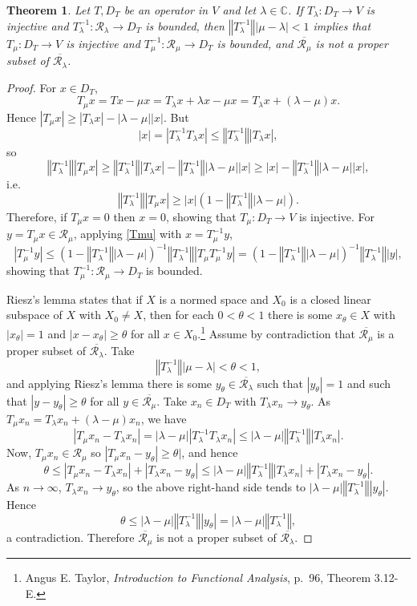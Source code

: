 \documentclass{article}
\newcommand{\norm}[1]{\left\Vert #1 \right\Vert}
\newtheorem{theorem}{Theorem}
\theoremstyle{definition}
\begin{document}
\begin{theorem}
Let $T,D_T$ be an operator in $V$ and let $\lambda \in \mathbb{C}$. If $T_\lambda:D_T \to V$ is injective and
$T_\lambda^{-1}:\mathscr{R}_\lambda \to D_T$ is bounded, 
then $\norm{T_\lambda^{-1}} |\mu - \lambda| < 1$ implies that $T_\mu:D_T \to V$ is injective and 
$T_\mu^{-1}:\mathscr{R}_\mu \to D_T$ is bounded, and $\overline{\mathscr{R}_\mu}$ is not a proper subset of
$\overline{\mathscr{R}_\lambda}$.
\label{resolventtheorem}
\end{theorem}
\begin{proof}
For $x \in D_T$,
\[
T_\mu x = Tx - \mu x = T_\lambda x + \lambda x - \mu x = T_\lambda x + (\lambda-\mu)x.
\]
Hence $|T_\mu x| \geq |T_\lambda x| - |\lambda-\mu| |x|$. But
\[
|x|=
|T_\lambda^{-1} T_\lambda x| \leq \norm{T_\lambda^{-1}} |T_\lambda x|,
\]
so 
\[
\norm{T_\lambda^{-1}} |T_\mu x| \geq \norm{T_\lambda^{-1}}  |T_\lambda x| - \norm{T_\lambda^{-1}} |\lambda-\mu| |x|
\geq |x| -  \norm{T_\lambda^{-1}} |\lambda-\mu| |x|,
\]
i.e.
\begin{equation}
\norm{T_\lambda^{-1}} |T_\mu x| \geq |x|(1- \norm{T_\lambda^{-1}} |\lambda-\mu|).
\label{Tmu}
\end{equation}
Therefore, if $T_\mu x=0$ then $x=0$, showing that $T_\mu:D_T \to V$ is injective.
For $y=T_\mu x \in \mathscr{R}_\mu$, applying \eqref{Tmu} with $x=T_\mu^{-1}y$,
\[
|T_\mu^{-1} y| \leq (1- \norm{T_\lambda^{-1}} |\lambda-\mu|)^{-1} \norm{T_\lambda^{-1}} |T_\mu T_\mu^{-1}y| 
=(1- \norm{T_\lambda^{-1}} |\lambda-\mu|)^{-1} \norm{T_\lambda^{-1}} |y|,
\]
showing that $T_\mu^{-1}:\mathscr{R}_\mu \to D_T$ is bounded.

Riesz's lemma states that if $X$ is a normed  space and $X_0$ is a closed linear subspace of $X$ with $X_0 \neq X$,
then for each $0<\theta<1$ there is some $x_\theta \in X$ with $|x_\theta|=1$ and $|x-x_\theta| \geq \theta$ for all
$x \in X_0$.\footnote{Angus E. Taylor, {\em Introduction to Functional Analysis}, p.~96, Theorem 3.12-E.}
Assume by contradiction that $\overline{\mathscr{R}_\mu}$ is a proper subset of $\overline{\mathscr{R}_\lambda}$. 
Take
\[
\norm{T_\lambda^{-1}} |\mu - \lambda| < \theta < 1,
\]
and applying Riesz's lemma there is some
$y_\theta \in \overline{\mathscr{R}_\lambda}$ such that $|y_\theta|=1$ and such that
$|y-y_\theta| \geq \theta$ for all $y \in \overline{\mathscr{R}_\mu}$. 
Take $x_n \in D_T$ with $T_\lambda x_n \to y_\theta$. As $T_\mu x_n = T_\lambda x_n + (\lambda-\mu)x_n$,
we have 
\[
|T_\mu x_n - T_\lambda x_n| = |\lambda-\mu| |T_\lambda^{-1} T_\lambda x_n| \leq |\lambda-\mu| 
\norm{T_\lambda^{-1}} |T_\lambda x_n|.
\]
Now, $T_\mu x_n \in \mathscr{R}_\mu$ so $|T_\mu x_n - y_\theta| \geq \theta|$, and hence 
\[
\theta \leq |T_\mu x_n - T_\lambda x_n| + |T_\lambda x_n - y_\theta|
\leq |\lambda-\mu| 
\norm{T_\lambda^{-1}} |T_\lambda x_n|+|T_\lambda x_n - y_\theta|.
\]
As $n \to \infty$, $T_\lambda x_n \to y_\theta$, so the above right-hand side tends to 
$|\lambda-\mu| 
\norm{T_\lambda^{-1}} |y_\theta|$. Hence
\[
\theta \leq |\lambda-\mu| 
\norm{T_\lambda^{-1}} |y_\theta| = |\lambda-\mu| 
\norm{T_\lambda^{-1}},
\]
a contradiction. Therefore $\overline{\mathscr{R}_\mu}$ is not a proper subset of $\overline{\mathscr{R}_\lambda}$. 
\end{proof}
\end{document}
